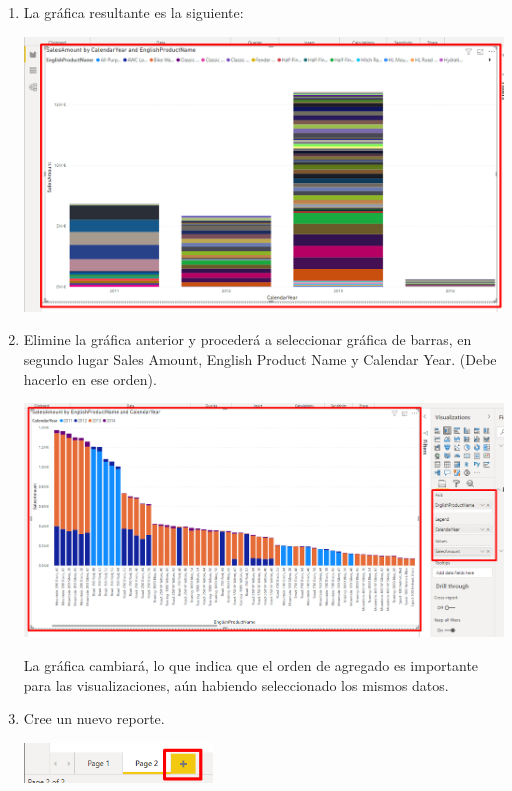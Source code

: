 \documentclass[12pt,letterpaper]{article}
\newcommand\tab[1][1cm]{\hspace*{#1}}
\begin{document}
\begin{enumerate}[\tab 1.]
\begin{center}
        \end{center}
        \item La gráfica resultante es la siguiente:
        \begin{center}
            \includegraphics[width=13cm]{./img/img6.png}
        \end{center}
        \item Elimine la gráfica anterior y procederá a seleccionar gráfica de barras, en segundo lugar Sales Amount, English Product Name y Calendar Year. (Debe hacerlo en ese orden).
        \begin{center}
            \includegraphics[width=13cm]{./img/img7.png}
        \end{center}
        La gráfica cambiará, lo que indica que el orden de agregado es importante para las visualizaciones, aún habiendo seleccionado los mismos datos.          
        \item Cree un nuevo reporte.
        \begin{center}
            \includegraphics[width=5cm]{./img/img8.png}

\end{center}
\end{enumerate}
\end{document}
